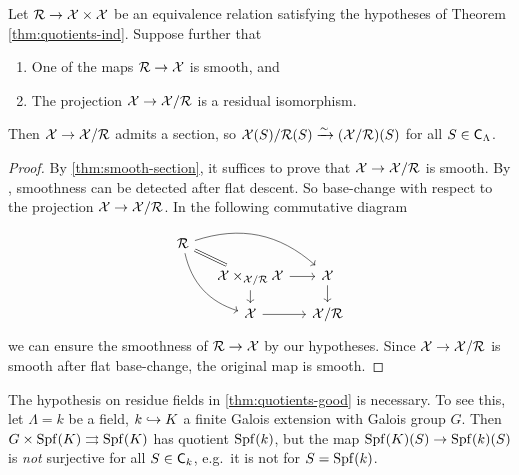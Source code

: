 \begin{corollary}\label{thm:quotients-good}
Let $\mathcal{R}\to \mathcal{X}\times \mathcal{X}$ be an equivalence relation satisfying the hypotheses 
of Theorem \ref{thm:quotients-ind}. Suppose further that 
\begin{enumerate}
\item
One of the maps $\mathcal{R}\to \mathcal{X}$ is smooth, and 

\item
The projection $\mathcal{X}\to \mathcal{X}/\mathcal{R}$ is a residual isomorphism. 
\end{enumerate}
Then $\mathcal{X}\to \mathcal{X}/\mathcal{R}$ admits a section, so $\mathcal{X}(S)/\mathcal{R}(S)\xrightarrow\sim (\mathcal{X}/\mathcal{R})(S)$ 
for all $S\in \mathsf{C}_\Lambda$. 
\end{corollary}
\begin{proof}
By \ref{thm:smooth-section}, it suffices to prove that $\mathcal{X}\to \mathcal{X}/\mathcal{R}$ is 
smooth. By \cite[17.7.3(ii)]{ega4-4}, smoothness can be detected after flat 
descent. So base-change with respect to the projection $\mathcal{X}\to \mathcal{X}/\mathcal{R}$. In the 
following commutative diagram 
\[
\begin{tikzcd}[column sep=small, row sep=small]
	\cR \ar[dr, equal] \ar[drr, bend left] \ar[ddr, bend right] \\
	& \cX\times_{\cX/\cR}\cX \ar[r] \ar[d]
		& \cX \ar[d] \\
	& \cX \ar[r]
		& \cX/\cR
\end{tikzcd}
\]
we can ensure the smoothness of $\mathcal{R}\to \mathcal{X}$ by our hypotheses. Since  
$\mathcal{X}\to \mathcal{X}/\mathcal{R}$ is smooth after flat base-change, the original map is smooth. 
\end{proof}

\begin{example}
The hypothesis on residue fields in \ref{thm:quotients-good} is necessary. To 
see this, let $\Lambda=k$ be a field, $k\hookrightarrow K$ a finite Galois extension 
with Galois group $G$. Then $G\times \operatorname{Spf}(K)\rightrightarrows \operatorname{Spf}(K)$ has 
quotient $\operatorname{Spf}(k)$, but the map $\operatorname{Spf}(K)(S)\to \operatorname{Spf}(k)(S)$ is \emph{not} 
surjective for all $S\in \mathsf{C}_k$, e.g.~it is not for $S=\operatorname{Spf}(k)$. 
\end{example}

